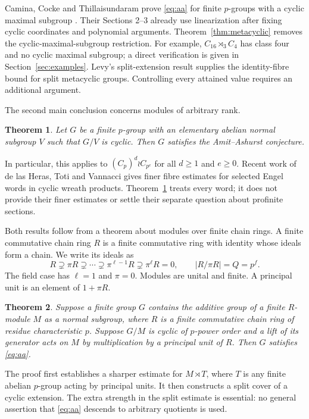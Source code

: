\documentclass[11pt]{article}
\newtheorem{theorem}{Theorem}[section]
\theoremstyle{remark}\newtheorem{remark}[theorem]{Remark}
\begin{document}
Camina, Cocke and Thillaisundaram prove \eqref{eq:aa} for finite $p$-groups with a cyclic maximal subgroup \cite[Theorem A]{CCT}. Their Sections 2--3 already use linearization after fixing cyclic coordinates and polynomial arguments. Theorem~\ref{thm:metacyclic} removes the cyclic-maximal-subgroup restriction. For example, $C_{16}\rtimes_3 C_4$ has class four and no cyclic maximal subgroup; a direct verification is given in Section~\ref{sec:examples}. Levy's split-extension result \cite[Proposition 1.3]{L} supplies the identity-fibre bound for split metacyclic groups. Controlling every attained value requires an additional argument.

The second main conclusion concerns modules of arbitrary rank.
\begin{theorem}\label{thm:elementary}
Let $G$ be a finite $p$-group with an elementary abelian normal subgroup $V$ such that $G/V$ is cyclic. Then $G$ satisfies the Amit--Ashurst conjecture.
\end{theorem}
In particular, this applies to $(C_p)^d\wr C_{p^e}$ for all $d\ge1$ and $e\ge0$. Recent work of de las Heras, Toti and Vannacci \cite{HTV} gives finer fibre estimates for selected Engel words in cyclic wreath products. Theorem~\ref{thm:elementary} treats every word; it does not provide their finer estimates or settle their separate question about profinite sections.

Both results follow from a theorem about modules over finite chain rings. A finite commutative chain ring $R$ is a finite commutative ring with identity whose ideals form a chain. We write its ideals as
\[
 R\supsetneq \pi R\supsetneq\cdots\supsetneq\pi^{\ell-1}R
 \supsetneq\pi^\ell R=0,
 \qquad |R/\pi R|=Q=p^f.
\]
The field case has $\ell=1$ and $\pi=0$. Modules are unital and finite. A principal unit is an element of $1+\pi R$.

\begin{theorem}\label{thm:extension}
Suppose a finite group $G$ contains the additive group of a finite $R$-module $M$ as a normal subgroup, where $R$ is a finite commutative chain ring of residue characteristic $p$. Suppose $G/M$ is cyclic of $p$-power order and a lift of its generator acts on $M$ by multiplication by a principal unit of $R$. Then $G$ satisfies \eqref{eq:aa}.
\end{theorem}

The proof first establishes a sharper estimate for $M\rtimes T$, where $T$ is any finite abelian $p$-group acting by principal units. It then constructs a split cover of a cyclic extension. The extra strength in the split estimate is essential: no general assertion that \eqref{eq:aa} descends to arbitrary quotients is used.
\end{document}
